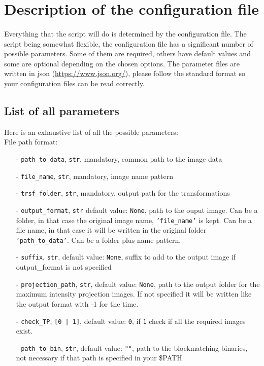 \documentclass[10pt,a4paper]{article}
\newcommand{\option}[1]{{\texttt{'#1'}}}
\begin{document}
\section{Description of the configuration file}
\paragraph{}Everything that the script will do is determined by the configuration file. The script being somewhat flexible, the configuration file has a significant number of possible parameters. Some of them are required, others have default values and some are optional depending on the chosen options. The parameter files are written in json (\url{https://www.json.org/}), please follow the standard format so your configuration files can be read correctly.
\subsection{List of all parameters}
Here is an exhaustive list of all the possible parameters:\\
File path format:
\begin{itemize}
\item[-] \texttt{path\_to\_data}, \texttt{str}, mandatory, common path to the image data
\item[-] \texttt{file\_name}, \texttt{str}, mandatory, image name pattern
\item[-] \texttt{trsf\_folder}, \texttt{str}, mandatory, output path for the transformations
\item[-] \texttt{output\_format}, \texttt{str} default value: \texttt{None}, path to the ouput image. Can be a folder, in that case the original image name, \option{file\_name} is kept. Can be a file name, in that case it will be written in the original folder \option{path\_to\_data}. Can be a folder plus name pattern.
\item[-] \texttt{suffix}, \texttt{str}, default value: \texttt{None}, suffix to add to the output image if output\_format is not specified
\item[-] \texttt{projection\_path}, \texttt{str}, default value: \texttt{None}, path to the output folder for the maximum intensity projection images. If not specified it will be written like the output format with -1 for the time.
\item[-] \texttt{check\_TP}, \texttt{[0 | 1]}, default value: \texttt{0}, if \texttt{1} check if all the required images exist.
\item[-] \texttt{path\_to\_bin}, \texttt{str}, default value: \texttt{""}, path to the blockmatching binaries, not necessary if that path is specified in your \$PATH
\end{itemize}~\\
\end{document}

